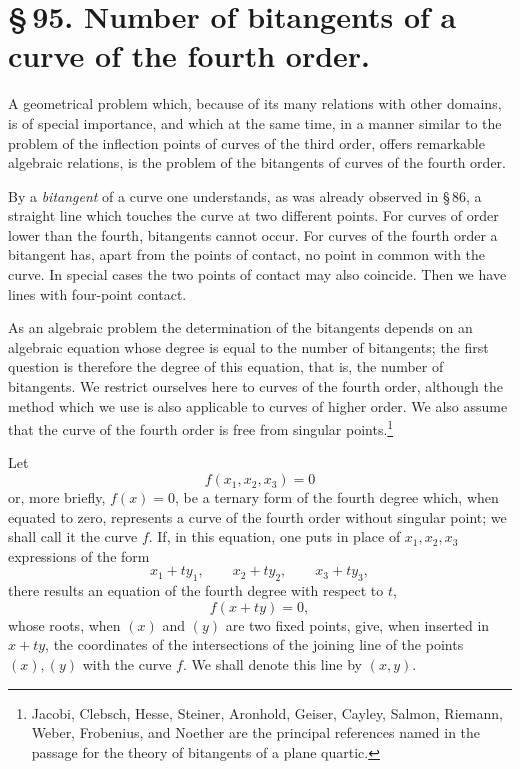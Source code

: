 \documentclass[11pt]{article}
\begin{document}
\section*{\S\,95. Number of bitangents of a curve of the fourth order.}

A geometrical problem which, because of its many relations with other domains, is of special importance, and which at the same time, in a manner similar to the problem of the inflection points of curves of the third order, offers remarkable algebraic relations, is the problem of the bitangents of curves of the fourth order.

By a \emph{bitangent} of a curve one understands, as was already observed in \S\,86, a straight line which touches the curve at two different points. For curves of order lower than the fourth, bitangents cannot occur. For curves of the fourth order a bitangent has, apart from the points of contact, no point in common with the curve. In special cases the two points of contact may also coincide. Then we have lines with four-point contact.

As an algebraic problem the determination of the bitangents depends on an algebraic equation whose degree is equal to the number of bitangents; the first question is therefore the degree of this equation, that is, the number of bitangents. We restrict ourselves here to curves of the fourth order, although the method which we use is also applicable to curves of higher order. We also assume that the curve of the fourth order is free from singular points.\footnote{Jacobi, Clebsch, Hesse, Steiner, Aronhold, Geiser, Cayley, Salmon, Riemann, Weber, Frobenius, and Noether are the principal references named in the passage for the theory of bitangents of a plane quartic.}

Let
\begin{equation}
 f(x_1,x_2,x_3)=0
 \tag{1}
\end{equation}
or, more briefly, \(f(x)=0\), be a ternary form of the fourth degree which, when equated to zero, represents a curve of the fourth order without singular point; we shall call it the curve \(f\). If, in this equation, one puts in place of \(x_1,x_2,x_3\) expressions of the form
\[
 x_1+t y_1,\qquad x_2+t y_2,\qquad x_3+t y_3,
\]
there results an equation of the fourth degree with respect to \(t\),
\begin{equation}
 f(x+t y)=0,
 \tag{2}
\end{equation}
whose roots, when \((x)\) and \((y)\) are two fixed points, give, when inserted in \(x+t y\), the coordinates of the intersections of the joining line of the points \((x),(y)\) with the curve \(f\). We shall denote this line by \((x,y)\).
\end{document}
